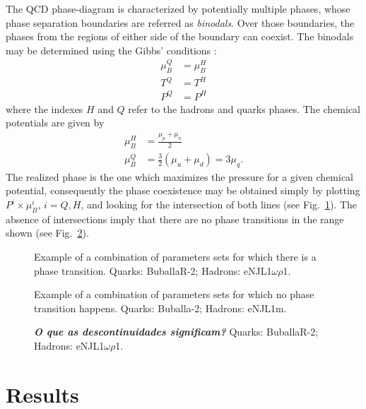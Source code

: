 \documentclass[prc, reprint, amsmath, floatfix, linenumbers,10pt]{revtex4-1}
\newcommand{\comment}[1]{{\bf\textit{#1}}}
\begin{document}
The QCD phase-diagram is characterized by potentially multiple phases, whose phase separation boundaries are referred as \emph{binodals}. Over those boundaries, the phases from the regions of either side of the boundary can coexist. The binodals may be determined using the Gibbs' conditions \cite{Cavagnoli2011}:
\begin{align}
\mu_B^Q &= \mu_B^H \\
T^Q &= T^H \\
P^Q &= P^H
\end{align}
%
where the indexes $H$ and $Q$ refer to the hadrons and quarks phases. The chemical potentials are given by
\begin{align}
	\mu_B^H &= \frac{\mu_p + \mu_n}{2} \\
	\mu_B^Q &= \frac{3}{2} (\mu_u + \mu_d) = 3 \mu_q.
\end{align}
%
The realized phase is the one which maximizes the pressure for a given chemical potential, consequently the phase coexistence may be obtained simply by plotting $P^i \times \mu_B^i$, $i = Q, H$, and looking for the intersection of both lines (see Fig.~\ref{Fig:Intersection}). The absence of intersections imply that there are no phase transitions in the range shown (see Fig.~\ref{Fig:NoIntersection}).

\begin{figure}
	
	\caption{Example of a combination of parameters sets for which there is a phase transition. Quarks: BuballaR-2; Hadrons: eNJL1$\omega\rho$1. \label{Fig:Intersection}}
\end{figure}

\begin{figure}
	
	\caption{Example of a combination of parameters sets for which no phase transition happens. Quarks: Buballa-2; Hadrons: eNJL1m. \label{Fig:NoIntersection}}
\end{figure}

\begin{figure}
	
	\caption{\comment{O que as descontinuidades significam?} Quarks: BuballaR-2; Hadrons: eNJL1$\omega\rho$1.}
\end{figure}

\section{Results}
\end{document}

